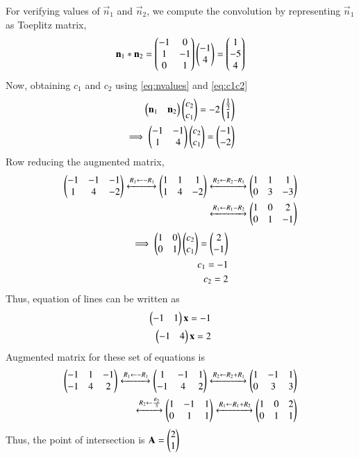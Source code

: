 \documentclass[journal,12pt,twocolumn]{IEEEtran}
\begin{document}
For verifying values of $\vec{n}_1$ and $\vec{n}_2$, we compute the convolution by representing $\vec{n}_1$ as Toeplitz matrix,
\begin{align}
    \mathbf{n}_1*\mathbf{n}_2=\begin{pmatrix}-1 & 0 \\ 1 & -1 \\ 0 & 1\end{pmatrix}\begin{pmatrix}-1 \\ 4\end{pmatrix} = \begin{pmatrix}1 \\ -5 \\ 4\end{pmatrix}
\end{align}
Now, obtaining $c_1$ and $c_2$ using \eqref{eq:nvalues} and \eqref{eq:c1c2}
\begin{align}
    \begin{pmatrix}\mathbf{n}_1 & \mathbf{n}_2\end{pmatrix}\begin{pmatrix}c_2 \\ c_1\end{pmatrix} = -2\begin{pmatrix}\frac{1}{2} \\ 1\end{pmatrix}\\
    \implies \begin{pmatrix}-1 & -1 \\ 1 & 4\end{pmatrix}\begin{pmatrix}c_2 \\ c_1\end{pmatrix} = \begin{pmatrix}-1 \\ -2\end{pmatrix}
\end{align}
Row reducing the augmented matrix,
\begin{align}
    \begin{pmatrix}-1 & -1 & -1 \\ 1 & 4 & -2\end{pmatrix} \xleftrightarrow{R_1 \leftarrow -R_1}\begin{pmatrix}1 & 1 & 1 \\ 1 & 4 & -2\end{pmatrix}\xleftrightarrow{R_2\leftarrow R_2-R_1}\begin{pmatrix}1 & 1 & 1 \\ 0 & 3 & -3\end{pmatrix}\\
    \xleftrightarrow{R_1\leftarrow R_1-R_2}\begin{pmatrix}1 & 0 & 2 \\ 0 & 1 & -1\end{pmatrix}
\end{align}
\begin{align}
    \implies \begin{pmatrix}1 & 0 \\ 0 & 1\end{pmatrix}\begin{pmatrix}c_2 \\ c_1\end{pmatrix} = \begin{pmatrix}2 \\ -1\end{pmatrix}\nonumber\\
    c_1 = -1\\
    c_2 = 2\label{eq:cvalues}
\end{align}
Thus, equation of lines can be written as
\begin{align}
    \begin{pmatrix}-1 & 1\end{pmatrix}\mathbf{x} = -1\\
    \begin{pmatrix}-1 & 4\end{pmatrix}\mathbf{x} = 2
\end{align}
Augmented matrix for these set of equations is
\begin{align}
    \begin{pmatrix}-1 & 1 & -1 \\ -1 & 4 & 2\end{pmatrix}\xleftrightarrow{R_1\leftarrow -R_1}\begin{pmatrix}1 & -1 & 1 \\ -1 & 4 & 2\end{pmatrix}\xleftrightarrow{R_2\leftarrow R_2+R_1}\begin{pmatrix}1 & -1 & 1 \\ 0 & 3 & 3\end{pmatrix}\\
    \xleftrightarrow{R_2\leftarrow \frac{R_2}{3}}\begin{pmatrix}1 & -1 & 1 \\ 0 & 1 & 1\end{pmatrix}\xleftrightarrow{R_1\leftarrow R_1+R_2}\begin{pmatrix}1 & 0 & 2 \\ 0 & 1 & 1\end{pmatrix}
\end{align}
Thus, the point of intersection is $\mathbf{A} = \begin{pmatrix}2 \\ 1\end{pmatrix}$
\end{document}
